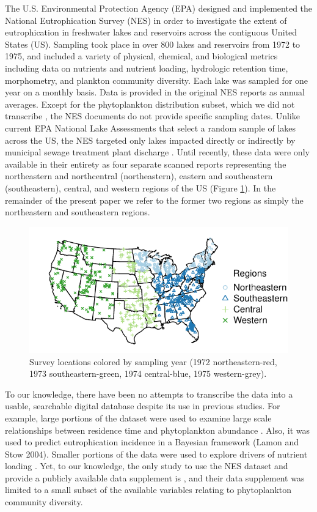 \documentclass[journal abbreviations, manuscript]{copernicus}
\begin{document}
The U.S. Environmental Protection Agency (EPA) designed and implemented the National Eutrophication Survey (NES) in order to investigate the extent of eutrophication in freshwater lakes and reservoirs across the contiguous United States (US). Sampling took place in over 800 lakes and reservoirs from 1972 to 1975, and included a variety of physical, chemical, and biological metrics including data on nutrients and nutrient loading, hydrologic retention time, morphometry, and plankton community diversity. Each lake was sampled for one year on a monthly basis. Data is provided in the original NES reports as annual averages. Except for the phytoplankton distribution subset, which we did not transcribe \citep[see ][]{stomp2011large}, the NES documents do not provide specific sampling dates. Unlike current EPA National Lake Assessments that select a random sample of lakes across the US, the NES  targeted only lakes impacted directly or indirectly by municipal sewage treatment plant discharge \citep{nla-methods, nes-methods}. Until recently, these data were only available in their entirety as four separate scanned reports representing the northeastern and northcentral  (northeastern), eastern and southeastern (southeastern), central, and western regions of the US (Figure \ref{fig:points_regions}). In the remainder of the present paper we refer to the former two regions as simply the northeastern and southeastern regions.

\begin{figure}[t]
  \includegraphics[width=12cm]{points_regions-crop.pdf}
  \caption{Survey locations colored by sampling year (1972 northeastern-red, 1973 southeastern-green, 1974 central-blue, 1975 western-grey).}\label{fig:points_regions}
\end{figure}

To our knowledge, there have been no attempts to transcribe the data into a usable, searchable digital database despite its use in previous studies.   For example, large portions of the dataset were used to examine large scale relationships between residence time and phytoplankton abundance \citep{soballe1987large}. Also, it was used to predict eutrophication incidence in a Bayesian framework (Lamon and Stow 2004). Smaller portions of the data were used to explore drivers of nutrient loading \citep{stomp2011large,Brettreviewreassessmentlake2007}. Yet, to our knowledge, the only study to use the NES dataset and provide a publicly available data supplement is \citet{stomp2011large}, and their data supplement was limited to a small subset of the available variables relating to phytoplankton community diversity. 
\end{document}

